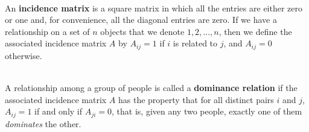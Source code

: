 \begin{definition}
	\hfill\\
	An \textbf{incidence matrix} is a square matrix in which all the entries are either zero or one and, for convenience, all the diagonal entries are zero. If we have a relationship on a set of $n$ objects that we denote $1, 2, \dots, n$, then we define the associated incidence matrix $A$ by $A_{ij} = 1$ if $i$ is related to $j$, and $A_{ij} = 0$ otherwise.
\end{definition}

\begin{definition}
	\hfill\\
	A relationship among a group of people is called a \textbf{dominance relation} if the associated incidence matrix $A$ has the property that for all distinct pairs $i$ and $j$, $A_{ij} = 1$ if and only if $A_{ji} = 0$, that is, given any two people, exactly one of them \textit{dominates} the other.
\end{definition}
